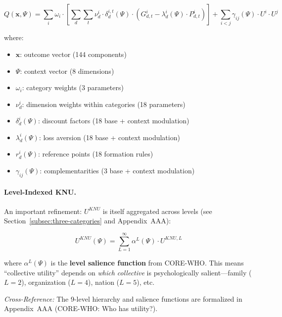 \begin{tcolorbox}[colback=blue!5!white, colframe=blue!75!black, title=The EBF Welfare Function]
\begin{equation}
Q(\mathbf{x}, \Psi) = \sum_{i} \omega_i \cdot \left[ \sum_{d} \sum_{t} \nu^i_d \cdot \delta^{i,t}_d(\Psi) \cdot \left( G^i_{d,t} - \lambda^i_d(\Psi) \cdot P^i_{d,t} \right) \right] + \sum_{i<j} \gamma_{ij}(\Psi) \cdot U^i \cdot U^j
\label{eq:bcm-welfare-complete}
\end{equation}

where:
\begin{itemize}
\item $\mathbf{x}$: outcome vector (144 components)
\item $\Psi$: context vector (8 dimensions)
\item $\omega_i$: category weights (3 parameters)
\item $\nu^i_d$: dimension weights within categories (18 parameters)
\item $\delta^i_d(\Psi)$: discount factors (18 base + context modulation)
\item $\lambda^i_d(\Psi)$: loss aversion (18 base + context modulation)
\item $r^i_d(\Psi)$: reference points (18 formation rules)
\item $\gamma_{ij}(\Psi)$: complementarities (3 base + context modulation)
\end{itemize}
\end{tcolorbox}

\paragraph{Level-Indexed KNU.}
An important refinement: $U^{KNU}$ is itself aggregated across levels
(see Section~\ref{subsec:three-categories} and Appendix~AAA):

\begin{equation}
U^{KNU}(\Psi) = \sum_{L=1}^{\infty} \alpha^L(\Psi) \cdot U^{KNU,L}
\label{eq:knu-level-aggregation}
\end{equation}

where $\alpha^L(\Psi)$ is the \textbf{level salience function} from CORE-WHO.
This means ``collective utility'' depends on \emph{which collective} is psychologically
salient---family ($L=2$), organization ($L=4$), nation ($L=5$), etc.

\textit{Cross-Reference:} The 9-level hierarchy and salience functions are
formalized in Appendix~AAA (CORE-WHO: Who has utility?).

